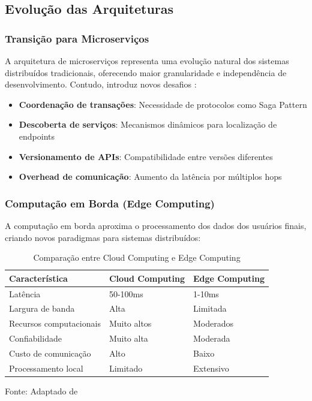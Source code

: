 \subsection{Evolução das Arquiteturas}

\subsubsection{Transição para Microserviços}

A arquitetura de microserviços representa uma evolução natural dos sistemas distribuídos tradicionais, oferecendo maior granularidade e independência de desenvolvimento. Contudo, introduz novos desafios \cite{tanenbaum2016sistemas}:

\begin{itemize}
    \item \textbf{Coordenação de transações}: Necessidade de protocolos como Saga Pattern
    \item \textbf{Descoberta de serviços}: Mecanismos dinâmicos para localização de endpoints
    \item \textbf{Versionamento de APIs}: Compatibilidade entre versões diferentes
    \item \textbf{Overhead de comunicação}: Aumento da latência por múltiplos hops
\end{itemize}

\subsubsection{Computação em Borda (Edge Computing)}

A computação em borda aproxima o processamento dos dados dos usuários finais, criando novos paradigmas para sistemas distribuídos:

\begin{table}[H]
\centering
\caption{Comparação entre Cloud Computing e Edge Computing}
\begin{tabular}{|l|l|l|}
\hline
\textbf{Característica} & \textbf{Cloud Computing} & \textbf{Edge Computing} \\
\hline
Latência & 50-100ms & 1-10ms \\
\hline
Largura de banda & Alta & Limitada \\
\hline
Recursos computacionais & Muito altos & Moderados \\
\hline
Confiabilidade & Muito alta & Moderada \\
\hline
Custo de comunicação & Alto & Baixo \\
\hline
Processamento local & Limitado & Extensivo \\
\hline
\end{tabular}
\label{tab:cloud_vs_edge}
{\fontsize{10pt}{\baselineskip}\selectfont
Fonte: Adaptado de }
\end{table}

